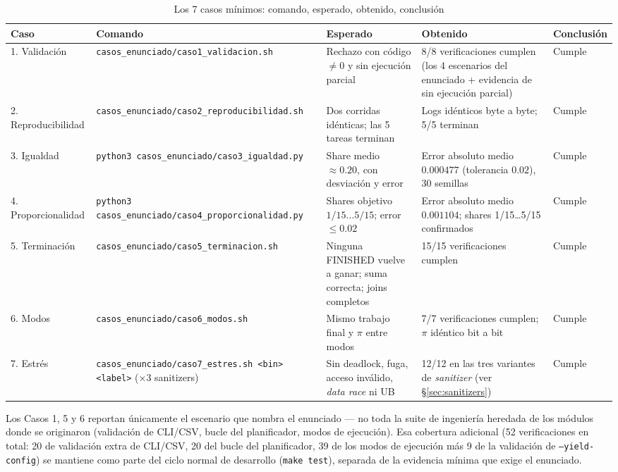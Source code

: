 \begin{table}[htbp]
\caption{Los 7 casos mínimos: comando, esperado, obtenido, conclusión}
\label{tab:casos}
\centering
\renewcommand{\arraystretch}{1.25}
\begin{tabular}{p{1.2cm}p{3.6cm}p{4.0cm}p{4.9cm}p{1.6cm}}
\toprule
\textbf{Caso} & \textbf{Comando} & \textbf{Esperado} & \textbf{Obtenido} & \textbf{Conclusión} \\
\midrule
1. Validación &
  \texttt{casos\_enunciado/\allowbreak caso1\_validacion.sh} &
  Rechazo con código $\neq 0$ y sin ejecución parcial &
  8/8 verificaciones cumplen (los 4 escenarios del enunciado + evidencia de sin ejecución parcial) &
  Cumple \\
\midrule
2. Reproducibilidad &
  \texttt{casos\_enunciado/\allowbreak caso2\_reproducibilidad.sh} &
  Dos corridas idénticas; las 5 tareas terminan &
  Logs idénticos byte a byte; 5/5 terminan &
  Cumple \\
\midrule
3. Igualdad &
  \texttt{python3 casos\_enunciado/\allowbreak caso3\_igualdad.py} &
  Share medio $\approx 0.20$, con desviación y error &
  Error absoluto medio $0.000477$ (tolerancia $0.02$), 30 semillas &
  Cumple \\
\midrule
4. Proporcionalidad &
  \texttt{python3 casos\_enunciado/\allowbreak caso4\_proporcionalidad.py} &
  Shares objetivo $1/15 \ldots 5/15$; error $\leq 0.02$ &
  Error absoluto medio $0.001104$; shares 1/15\ldots5/15 confirmados &
  Cumple \\
\midrule
5. Terminación &
  \texttt{casos\_enunciado/\allowbreak caso5\_terminacion.sh} &
  Ninguna FINISHED vuelve a ganar; suma correcta; joins completos &
  15/15 verificaciones cumplen &
  Cumple \\
\midrule
6. Modos &
  \texttt{casos\_enunciado/\allowbreak caso6\_modos.sh} &
  Mismo trabajo final y $\pi$ entre modos &
  7/7 verificaciones cumplen; $\pi$ idéntico bit a bit &
  Cumple \\
\midrule
7. Estrés &
  \texttt{casos\_enunciado/\allowbreak caso7\_estres.sh <bin> <label>} (×3 sanitizers) &
  Sin deadlock, fuga, acceso inválido, \textit{data race} ni UB &
  12/12 en las tres variantes de \textit{sanitizer} (ver \S\ref{sec:sanitizers}) &
  Cumple \\
\bottomrule
\end{tabular}
\end{table}

Los Casos 1, 5 y 6 reportan únicamente el escenario que nombra el enunciado
--- no toda la suite de ingeniería heredada de los módulos donde se
originaron (validación de CLI/CSV, bucle del planificador, modos de
ejecución). Esa cobertura adicional (52 verificaciones en total: 20 de
validación extra de CLI/CSV, 20 del bucle del planificador, 39 de los modos
de ejecución más 9
de la validación de \texttt{--yield-config}) se mantiene como parte del
ciclo normal de desarrollo (\texttt{make test}), separada de la evidencia
mínima que exige el enunciado.

